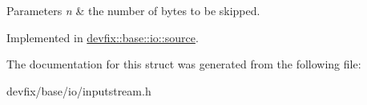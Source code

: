 \begin{DoxyParams}{Parameters}
{\em n} & the number of bytes to be skipped. \\
\hline
\end{DoxyParams}


Implemented in \hyperlink{structdevfix_1_1base_1_1io_1_1source_a21cb579307589cbc6f9e02d64c66f4b2}{devfix\+::base\+::io\+::source}.



The documentation for this struct was generated from the following file\+:\begin{DoxyCompactItemize}
\item 
devfix/base/io/inputstream.\+h\end{DoxyCompactItemize}
